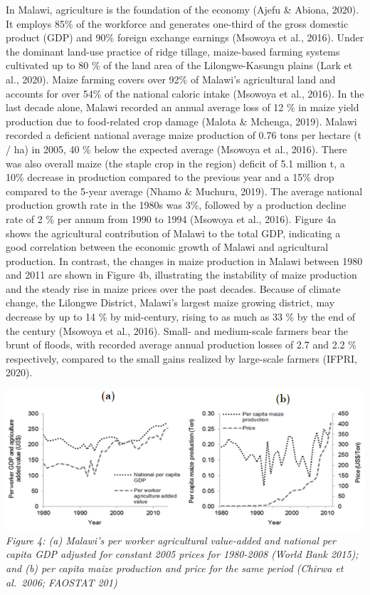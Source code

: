 \documentclass[
]{book}
\begin{document}
In Malawi, agriculture is the foundation of the economy (Ajefu \& Abiona, 2020). It employs 85\% of the workforce and generates one-third of the gross domestic product (GDP) and 90\% foreign exchange earnings (Msowoya et al., 2016). Under the dominant land-use practice of ridge tillage, maize-based farming systems cultivated up to 80 \% of the land area of the Lilongwe-Kasungu plains (Lark et al., 2020). Maize farming covers over 92\% of Malawi's agricultural land and accounts for over 54\% of the national caloric intake (Msowoya et al., 2016). In the last decade alone, Malawi recorded an annual average loss of 12 \% in maize yield production due to food-related crop damage (Malota \& Mchenga, 2019). Malawi recorded a deficient national average maize production of 0.76 tons per hectare (t / ha) in 2005, 40 \% below the expected average (Msowoya et al., 2016). There was also overall maize (the staple crop in the region) deficit of 5.1 million t, a 10\% decrease in production compared to the previous year and a 15\% drop compared to the 5-year average (Nhamo \& Muchuru, 2019). The average national production growth rate in the 1980s was 3\%, followed by a production decline rate of 2 \% per annum from 1990 to 1994 (Msowoya et al., 2016). Figure 4a shows the agricultural contribution of Malawi to the total GDP, indicating a good correlation between the economic growth of Malawi and agricultural production. In contrast, the changes in maize production in Malawi between 1980 and 2011 are shown in Figure 4b, illustrating the instability of maize production and the steady rise in maize prices over the past decades. Because of climate change, the Lilongwe District, Malawi's largest maize growing district, may decrease by up to 14 \% by mid-century, rising to as much as 33 \% by the end of the century (Msowoya et al., 2016). Small- and medium-scale farmers bear the brunt of floods, with recorded average annual production losses of 2.7 and 2.2 \% respectively, compared to the small gains realized by large-scale farmers (IFPRI, 2020).

\includegraphics{images/gdp_per_worker.png}
\emph{Figure 4: (a) Malawi's per worker agricultural value-added and national per capita GDP adjusted for constant 2005 prices for 1980-2008 (World Bank 2015); and (b) per capita maize production and price for the same period (Chirwa et al.~2006; FAOSTAT 201)}
\end{document}

